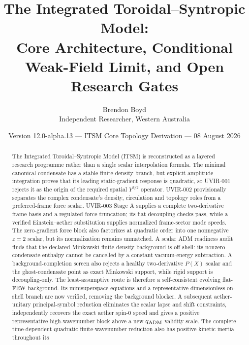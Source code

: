 ﻿\documentclass[11pt]{article}
\title{The Integrated Toroidal--Syntropic Model:\\
Core Architecture, Conditional Weak-Field Limit, and Open Research Gates}
\author{Brendon Boyd\\Independent Researcher, Western Australia}
\date{Version 12.0-alpha.13 --- ITSM Core Topology Derivation --- 08 August 2026}
\begin{document}
\maketitle

\begin{center}
\end{center}

\begin{abstract}
The Integrated Toroidal--Syntropic Model (ITSM) is reconstructed as a layered
research programme rather than a single scalar interpolation formula.  The
minimal canonical condensate has a stable finite-density branch, but explicit
amplitude integration proves that its leading static-gradient response is
quadratic, so UVIR-001 rejects it as the origin of the required spatial
$Y^{3/2}$ operator.  UVIR-002 provisionally separates the complex condensate's
density, circulation and topology roles from a preferred-frame force scalar.
UVIR-003 Stage A supplies a complete two-derivative frame basis and a regulated
force truncation; its flat decoupling checks pass, while a verified
Einstein--aether substitution supplies normalized frame-sector mode speeds.
The zero-gradient force block also factorizes at quadratic order into one
nonnegative $z=2$ scalar, but its normalization remains unmatched.  A scalar
ADM readiness audit finds that the declared Minkowski finite-density
background is off shell: its nonzero condensate enthalpy cannot be cancelled
by a constant vacuum-energy subtraction.  A background-completion screen also
rejects a healthy two-derivative $P(X)$ scalar and the ghost-condensate point
as exact Minkowski support, while rigid support is decoupling-only.  The
least-assumptive route is therefore a self-consistent evolving flat-FRW
background.  Its minisuperspace equations and a representative dimensionless
on-shell branch are now verified, removing the background blocker.  A
subsequent aether-unitary principal-symbol reduction eliminates the scalar
lapse and shift constraints, independently recovers the exact aether spin-0
speed and gives a positive representative high-wavenumber block above a new
$q_{\rm ADM}$ validity scale.  The complete time-dependent quadratic
finite-wavenumber reduction also has positive kinetic inertia throughout its

\end{abstract}
\end{document}
